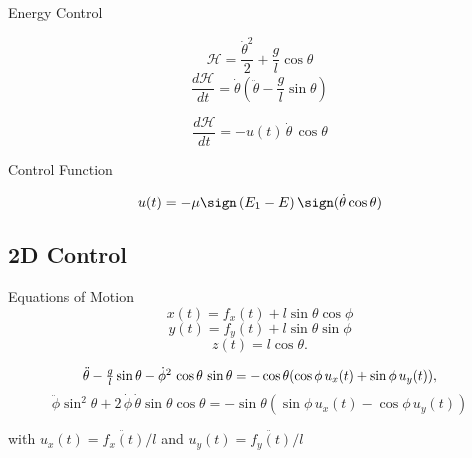 \documentclass{beamer}
\begin{document}
\begin{frame}[t]{Energy Control}


  \begin{equation}
    \mathcal{H}=\frac{\dot{\theta}^2}{2}+ \frac{g}{l}\cos{\theta}
  \end{equation}
  \vspace{0.5 cm}
\begin{equation}
 \frac{d\mathcal{H}}{dt}=\dot{\theta}\left(\ddot{\theta}-\frac{g}{l}\sin{\theta}\right)
\end{equation}

\begin{equation}
    \frac{d\mathcal{H}}{dt}=-u(t) \,\dot{\theta}\,\cos{\theta}
    \label{control1d}
\end{equation}
\begin{block}{Control Function}

  \begin{equation}
    u(t)=-\mu  \sign\left({E_1-E}\right) \sign(\dot{\theta} \cos{\theta})
 \label{u1d}
\end{equation}
\end{block}

\end{frame}

\subsection{2D Control}
\begin{frame}[t]{Equations of Motion}
\begin{equation}
x(t) =f_x(t)+ l \sin{\theta}\cos{\phi}   
\end{equation}
\begin{equation}
  y(t)=f_y(t)+l\sin{\theta}\sin{\phi} 
\end{equation}
\begin{equation}
    z(t)=l \cos{\theta}.
\end{equation}



\begin{equation}
\scalebox{0.95}[1]{$\ddot{\theta}-\frac{g}{l}\sin{\theta}- \dot{\phi}^2\, \cos{\theta}\,\sin\theta =-\cos{\theta} (\cos{\phi}\, u_x(t)+ \sin{\phi}\, u_y(t)),$} 
\label{teta2d}
\end{equation}
\begin{equation}
  \ddot{\phi}\sin^2{\theta} +2 \, \dot{\phi} \,\dot{\theta}\sin{\theta} \cos{\theta}= -\sin{\theta}(\sin{\phi}\, u_x(t) - \cos{\phi} \,u_y(t))
  \label{phi2d}
\end{equation}

with $u_x(t)=\ddot{f_x(t)}/l$ and $u_y(t)=\ddot{f_y(t)}/l$



\end{frame}
\end{document}
